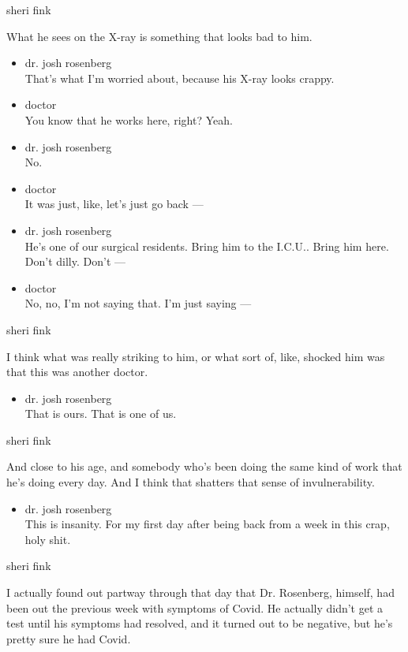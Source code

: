 sheri fink

What he sees on the X-ray is something that looks bad to him.

\begin{itemize}
\item
  dr. josh rosenberg\\
  That's what I'm worried about, because his X-ray looks crappy.
\item
  doctor\\
  You know that he works here, right? Yeah.
\item
  dr. josh rosenberg\\
  No.
\item
  doctor\\
  It was just, like, let's just go back ---
\item
  dr. josh rosenberg\\
  He's one of our surgical residents. Bring him to the I.C.U.. Bring him
  here. Don't dilly. Don't ---
\item
  doctor\\
  No, no, I'm not saying that. I'm just saying ---
\end{itemize}

sheri fink

I think what was really striking to him, or what sort of, like, shocked
him was that this was another doctor.

\begin{itemize}
\tightlist
\item
  dr. josh rosenberg\\
  That is ours. That is one of us.
\end{itemize}

sheri fink

And close to his age, and somebody who's been doing the same kind of
work that he's doing every day. And I think that shatters that sense of
invulnerability.

\begin{itemize}
\tightlist
\item
  dr. josh rosenberg\\
  This is insanity. For my first day after being back from a week in
  this crap, holy shit.
\end{itemize}

sheri fink

I actually found out partway through that day that Dr. Rosenberg,
himself, had been out the previous week with symptoms of Covid. He
actually didn't get a test until his symptoms had resolved, and it
turned out to be negative, but he's pretty sure he had Covid.

